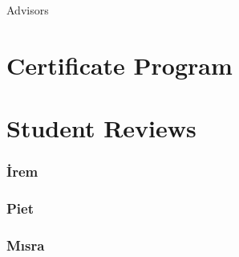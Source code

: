     \begin{frame}{Advisors}
    
      
    
    \end{frame}

    \section{Certificate Program}

      \begin{frame}
        \frametitle{}
      
        
      
      \end{frame}



      \section{Student Reviews}

      \begin{frame}
        \frametitle{İrem}
      
        
      
      \end{frame}

      \begin{frame}
        \frametitle{Piet}
      
        
      
      \end{frame}

      \begin{frame}
        \frametitle{Mısra}
      
        
      
      \end{frame}




